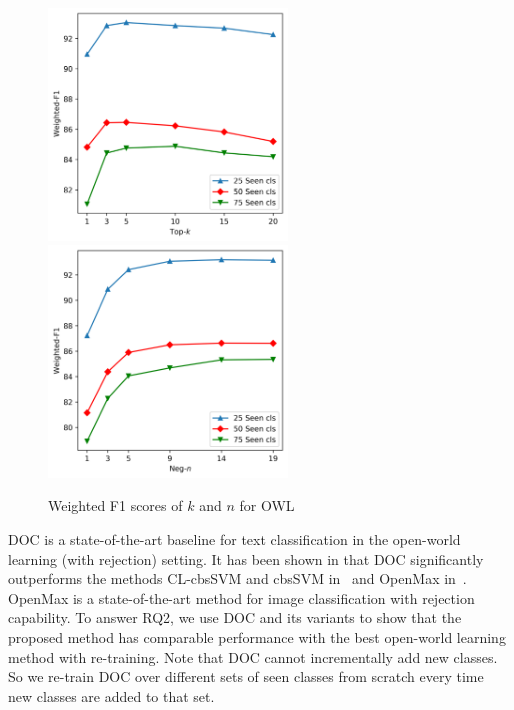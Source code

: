 
\begin{figure}
\center
\includegraphics[width=2.5in]{fig/www19_top_k.png}
\quad
\includegraphics[width=2.5in]{fig/www19_neg_n.png}
\caption{Weighted F1 scores of $k$ and $n$ for OWL}
\label{chap2:fig:kn}
\end{figure}

DOC \cite{shu-xu-liu:2017:EMNLP2017} is a state-of-the-art baseline for text classification in the open-world learning (with rejection) setting. It has been shown in \cite{shu-xu-liu:2017:EMNLP2017} that DOC significantly outperforms the methods CL-cbsSVM and cbsSVM in~\cite{fei2016learning} and OpenMax in~\cite{bendale2016towards}. OpenMax is a state-of-the-art method for image classification with rejection capability. 
To answer RQ2, we use DOC and its variants to show that the proposed method has comparable performance with the best open-world learning method with re-training.
Note that DOC cannot incrementally add new classes. 
So we re-train DOC over different sets of seen classes from scratch every time new classes are added to that set.

